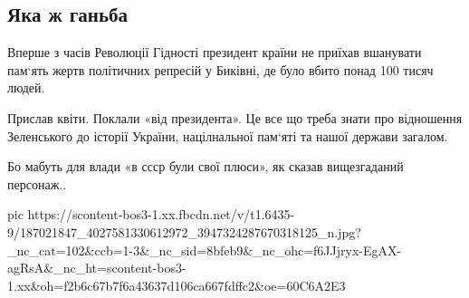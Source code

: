  
 
 
 
 
\subsection{Яка ж ганьба}
\label{sec:16_05_2021.fb.smolij_andrij.2.bykovnja_zelenskij_ganjba}

Вперше з часів Революції Гідності президент країни не приїхав вшанувати пам‘ять
жертв політичних репресій у Биківні, де було вбито понад 100 тисяч людей. 

Прислав квіти. Поклали «від президента». Це все що треба знати про відношення
Зеленського до історії України, націлнальної пам‘яті та нашої держави загалом. 

Бо мабуть для влади «в ссср були свої плюси», як сказав вищезгаданий персонаж..

\ifcmt
  pic https://scontent-bos3-1.xx.fbcdn.net/v/t1.6435-9/187021847_4027581330612972_3947324287670318125_n.jpg?_nc_cat=102&ccb=1-3&_nc_sid=8bfeb9&_nc_ohc=f6JJjryx-EgAX-agRsA&_nc_ht=scontent-bos3-1.xx&oh=f2b6c67b7f6a43637d106ca667fdffc2&oe=60C6A2E3
\fi

